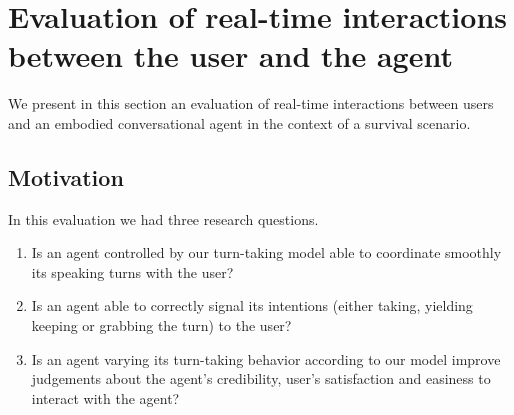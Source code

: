 \section{Evaluation of real-time interactions between the user and the agent}
\label{sec:eval}

We present in this section an evaluation of real-time interactions between users and an embodied conversational agent in the context of a survival scenario.

\subsection{Motivation}

In this evaluation we had three research questions.  \begin{enumerate}
	\item Is an agent controlled by our turn-taking model able to coordinate smoothly its speaking turns with the user?
	\item Is an agent able to correctly signal its intentions (either taking, yielding keeping or grabbing the turn) to the user?
	\item Is an agent varying its turn-taking behavior according to our model improve judgements about the agent's credibility, user's satisfaction and easiness to interact with the agent?
\end{enumerate}

